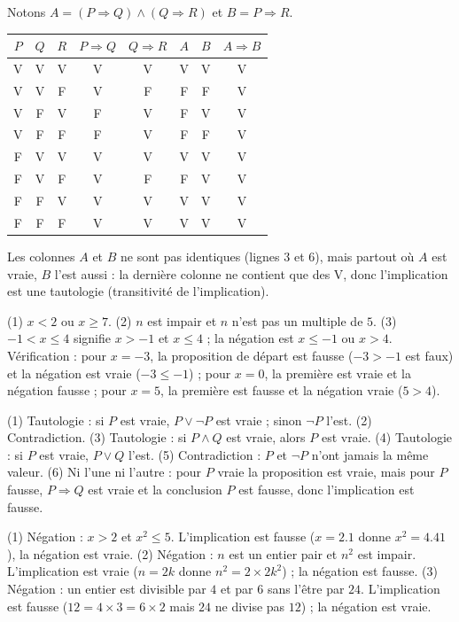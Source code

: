 \begin{solution}
Notons $A=(P\Rightarrow Q)\land(Q\Rightarrow R)$ et $B=P\Rightarrow R$.
\begin{center}
\begin{tabular}{c|c|c||c|c|c|c|c}
$P$ & $Q$ & $R$ & $P\Rightarrow Q$ & $Q\Rightarrow R$ & $A$ & $B$ & $A\Rightarrow B$\\\hline
V & V & V & V & V & V & V & V\\
V & V & F & V & F & F & F & V\\
V & F & V & F & V & F & V & V\\
V & F & F & F & V & F & F & V\\
F & V & V & V & V & V & V & V\\
F & V & F & V & F & F & V & V\\
F & F & V & V & V & V & V & V\\
F & F & F & V & V & V & V & V
\end{tabular}
\end{center}
Les colonnes $A$ et $B$ ne sont pas identiques (lignes 3 et 6), mais partout où $A$ est vraie, $B$ l'est aussi : la dernière colonne ne contient que des V, donc l'implication est une tautologie (transitivité de l'implication).
\end{solution}
\begin{solution}
(1) $x<2$ ou $x\ge7$. (2) $n$ est impair et $n$ n'est pas un multiple de $5$. (3) $-1<x\le4$ signifie $x>-1$ et $x\le4$ ; la négation est $x\le-1$ ou $x>4$. Vérification : pour $x=-3$, la proposition de départ est fausse ($-3>-1$ est faux) et la négation est vraie ($-3\le-1$) ; pour $x=0$, la première est vraie et la négation fausse ; pour $x=5$, la première est fausse et la négation vraie ($5>4$).
\end{solution}
\begin{solution}
(1) Tautologie : si $P$ est vraie, $P\lor\lnot P$ est vraie ; sinon $\lnot P$ l'est. (2) Contradiction. (3) Tautologie : si $P\land Q$ est vraie, alors $P$ est vraie. (4) Tautologie : si $P$ est vraie, $P\lor Q$ l'est. (5) Contradiction : $P$ et $\lnot P$ n'ont jamais la même valeur. (6) Ni l'une ni l'autre : pour $P$ vraie la proposition est vraie, mais pour $P$ fausse, $P\Rightarrow Q$ est vraie et la conclusion $P$ est fausse, donc l'implication est fausse.
\end{solution}
\begin{solution}
(1) Négation : $x>2$ et $x^2\le5$. L'implication est fausse ($x=\num{2,1}$ donne $x^2=\num{4,41}$), la négation est vraie. (2) Négation : $n$ est un entier pair et $n^2$ est impair. L'implication est vraie ($n=2k$ donne $n^2=2\times2k^2$) ; la négation est fausse. (3) Négation : un entier est divisible par $4$ et par $6$ sans l'être par $24$. L'implication est fausse ($12=4\times3=6\times2$ mais $24$ ne divise pas $12$) ; la négation est vraie.
\end{solution}
